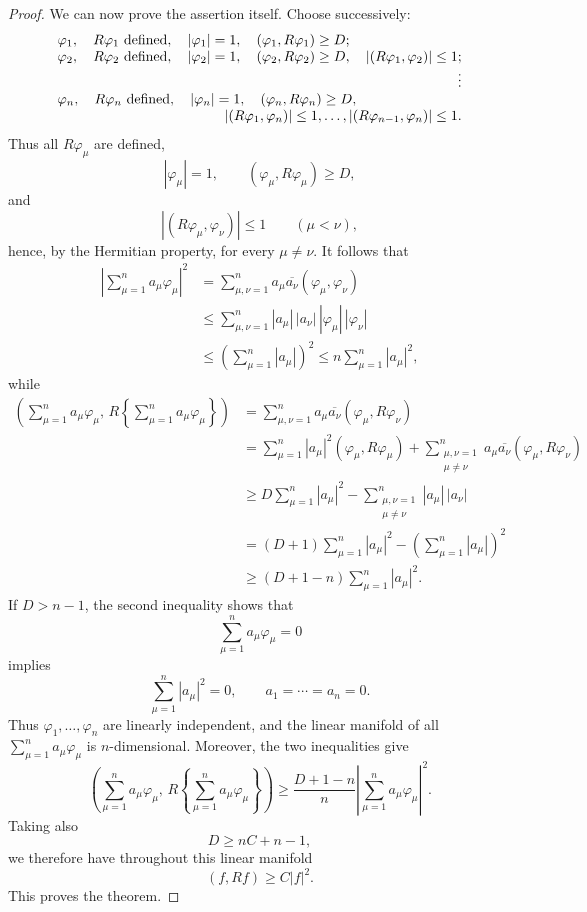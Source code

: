 ﻿\documentclass[paper=b5,fontsize=13pt,bookmarkpackage=false,twoside]{scrartcl}
\begin{document}
\begin{proof}
We can now prove the assertion itself. Choose successively:
\[
\begin{array}{l}
\varphi_1,\quad R\varphi_1\text{ defined},\quad
|\varphi_1|=1,\quad(\varphi_1,R\varphi_1)\ge D;\\
\varphi_2,\quad R\varphi_2\text{ defined},\quad
|\varphi_2|=1,\quad(\varphi_2,R\varphi_2)\ge D,\quad
|(R\varphi_1,\varphi_2)|\le1;\\
\hfill\vdots\\
\varphi_n,\quad R\varphi_n\text{ defined},\quad
|\varphi_n|=1,\quad(\varphi_n,R\varphi_n)\ge D,\\
\hfill
|(R\varphi_1,\varphi_n)|\le1,\ldots,
|(R\varphi_{n-1},\varphi_n)|\le1.
\end{array}
\]
Thus all $R\varphi_\mu$ are defined,
\[
|\varphi_\mu|=1,\qquad
(\varphi_\mu,R\varphi_\mu)\ge D,
\]
and
\[
|(R\varphi_\mu,\varphi_\nu)|\le1
\qquad(\mu<\nu),
\]
hence, by the Hermitian property, for every $\mu\ne\nu$. It follows that
\begin{align*}
\left|\sum_{\mu=1}^{n}a_\mu\varphi_\mu\right|^2
&=\sum_{\mu,\nu=1}^{n}
a_\mu\overline{a_\nu}(\varphi_\mu,\varphi_\nu)\\
&\le\sum_{\mu,\nu=1}^{n}
|a_\mu|\,|a_\nu|\,|\varphi_\mu|\,|\varphi_\nu|\\
&\le\left(\sum_{\mu=1}^{n}|a_\mu|\right)^2
\le n\sum_{\mu=1}^{n}|a_\mu|^2,
\end{align*}
while
\begin{align*}
\left(\sum_{\mu=1}^{n}a_\mu\varphi_\mu,\,
R\left\{\sum_{\mu=1}^{n}a_\mu\varphi_\mu\right\}\right)
&=\sum_{\mu,\nu=1}^{n}
a_\mu\overline{a_\nu}(\varphi_\mu,R\varphi_\nu)\\
&=\sum_{\mu=1}^{n}|a_\mu|^2(\varphi_\mu,R\varphi_\mu)
 +\sum_{\substack{\mu,\nu=1\\\mu\ne\nu}}^{n}
a_\mu\overline{a_\nu}(\varphi_\mu,R\varphi_\nu)\\
&\ge D\sum_{\mu=1}^{n}|a_\mu|^2
-\sum_{\substack{\mu,\nu=1\\\mu\ne\nu}}^{n}
|a_\mu|\,|a_\nu|\\
&=(D+1)\sum_{\mu=1}^{n}|a_\mu|^2
-\left(\sum_{\mu=1}^{n}|a_\mu|\right)^2\\
&\ge(D+1-n)\sum_{\mu=1}^{n}|a_\mu|^2.
\end{align*}
If $D>n-1$, the second inequality shows that
\[
\sum_{\mu=1}^{n}a_\mu\varphi_\mu=0
\]
implies
\[
\sum_{\mu=1}^{n}|a_\mu|^2=0,
\qquad
a_1=\cdots=a_n=0.
\]
Thus $\varphi_1,\ldots,\varphi_n$ are linearly independent, and the linear manifold of all $\sum_{\mu=1}^{n}a_\mu\varphi_\mu$ is $n$-dimensional. Moreover, the two inequalities give
\[
\left(\sum_{\mu=1}^{n}a_\mu\varphi_\mu,\,
R\left\{\sum_{\mu=1}^{n}a_\mu\varphi_\mu\right\}\right)
\ge
\frac{D+1-n}{n}
\left|\sum_{\mu=1}^{n}a_\mu\varphi_\mu\right|^2.
\]
Taking also
\[
D\ge nC+n-1,
\]
we therefore have throughout this linear manifold
\[
(f,Rf)\ge C|f|^2.
\]
This proves the theorem.
\end{proof}
\end{document}
